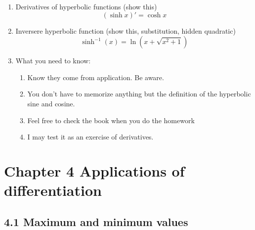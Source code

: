 \documentclass{article}
\begin{document}
\begin{enumerate}
\item Derivatives of hyperbolic functions (show this)
$$
(\sinh x)' = \cosh x
$$

\item Inversere hyperbolic function (show this, substitution, hidden quadratic)
$$
\sinh^{-1}(x) = \ln (x+\sqrt{x^2+1})
$$

\item What you need to know:
\begin{enumerate}
\item Know they come from application. Be aware.
\item You don't have to memorize anything but the definition of the hyperbolic sine and cosine.
\item Feel free to check the book when you do the homework
\item I may test it as an exercise of derivatives.
\end{enumerate}
\end{enumerate}


\section{Chapter 4 Applications of differentiation}

\subsection{4.1 Maximum and minimum values}
\end{document}
